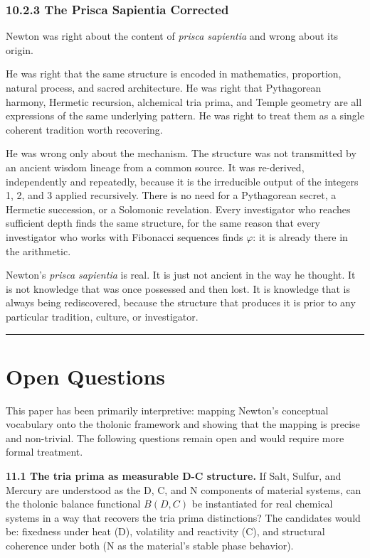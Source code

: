 \documentclass[12pt]{article}
\begin{document}
\subsubsection{10.2.3 The Prisca Sapientia
Corrected}\label{the-prisca-sapientia-corrected}

Newton was right about the content of \emph{prisca sapientia} and wrong
about its origin.

He was right that the same structure is encoded in mathematics,
proportion, natural process, and sacred architecture. He was right that
Pythagorean harmony, Hermetic recursion, alchemical tria prima, and
Temple geometry are all expressions of the same underlying pattern. He
was right to treat them as a single coherent tradition worth recovering.

He was wrong only about the mechanism. The structure was not transmitted
by an ancient wisdom lineage from a common source. It was re-derived,
independently and repeatedly, because it is the irreducible output of
the integers 1, 2, and 3 applied recursively. There is no need for a
Pythagorean secret, a Hermetic succession, or a Solomonic revelation.
Every investigator who reaches sufficient depth finds the same
structure, for the same reason that every investigator who works with
Fibonacci sequences finds \(\varphi\): it is already there in the
arithmetic.

Newton's \emph{prisca sapientia} is real. It is just not ancient in the
way he thought. It is not knowledge that was once possessed and then
lost. It is knowledge that is always being rediscovered, because the
structure that produces it is prior to any particular tradition,
culture, or investigator.

\begin{center}\rule{0.5\linewidth}{0.5pt}\end{center}

\section{Open Questions}\label{open-questions}

This paper has been primarily interpretive: mapping Newton's conceptual
vocabulary onto the tholonic framework and showing that the mapping is
precise and non-trivial. The following questions remain open and would
require more formal treatment.

\textbf{11.1 The tria prima as measurable D-C structure.} If Salt,
Sulfur, and Mercury are understood as the D, C, and N components of
material systems, can the tholonic balance functional \(B(D, C)\) be
instantiated for real chemical systems in a way that recovers the tria
prima distinctions? The candidates would be: fixedness under heat (D),
volatility and reactivity (C), and structural coherence under both (N as
the material's stable phase behavior).
\end{document}
